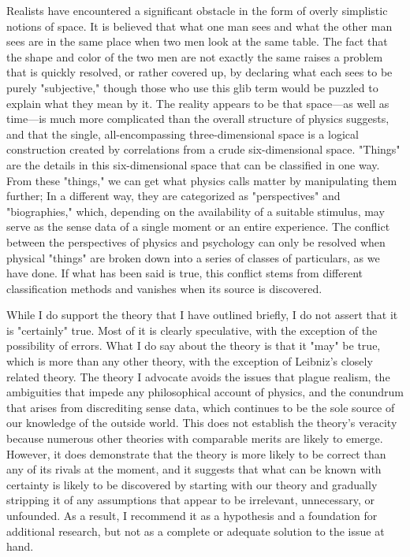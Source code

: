 \documentclass[a4paper,12pt]{book}[2004/02/16]
\theoremstyle{ilemma}
\theoremstyle{itheorem}
\theoremstyle{iother}
\theoremstyle{icorollary}
\theoremstyle{numcorollary}
\theoremstyle{idefinition}
\begin{document}
Realists have encountered a significant obstacle in the form of overly simplistic notions of space. It is believed that what one man sees and what the other man sees are in the same place when two men look at the same table. The fact that the shape and color of the two men are not exactly the same raises a problem that is quickly resolved, or rather covered up, by declaring what each sees to be purely "subjective," though those who use this glib term would be puzzled to explain what they mean by it. The reality appears to be that space—as well as time—is much more complicated than the overall structure of physics suggests, and that the single, all-encompassing three-dimensional space is a logical construction created by correlations from a crude six-dimensional space. "Things" are the details in this six-dimensional space that can be classified in one way. From these "things," we can get what physics calls matter by manipulating them further;
In a different way, they are categorized as "perspectives" and "biographies," which, depending on the availability of a suitable stimulus, may serve as the sense data of a single moment or an entire experience.
The conflict between the perspectives of physics and psychology can only be resolved when physical "things" are broken down into a series of classes of particulars, as we have done. If what has been said is true, this conflict stems from different classification methods and vanishes when its source is discovered.

While I do support the theory that I have outlined briefly, I do not assert that it is "certainly" true. Most of it is clearly speculative, with the exception of the possibility of errors. What I do say about the theory is that it "may" be true, which is more than any other theory, with the exception of Leibniz's closely related theory. The theory I advocate avoids the issues that plague realism, the ambiguities that impede any philosophical account of physics, and the conundrum that arises from discrediting sense data, which continues to be the sole source of our knowledge of the outside world. This does not establish the theory's veracity because numerous other theories with comparable merits are likely to emerge. However, it does demonstrate that the theory is more likely to be correct than any of its rivals at the moment, and it suggests that what can be known with certainty is likely to be discovered by starting with our theory and gradually stripping it of any assumptions that appear to be irrelevant, unnecessary, or unfounded. As a result, I recommend it as a hypothesis and a foundation for additional research, but not as a complete or adequate solution to the issue at hand.
\end{document}
